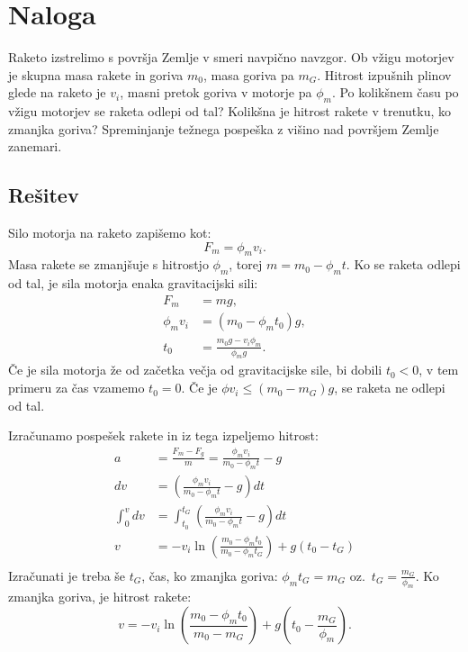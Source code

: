 \documentclass[a4,11pt]{article}
\begin{document}
\section{Naloga}
    Raketo izstrelimo s površja Zemlje v smeri navpično navzgor. Ob vžigu motorjev je skupna
    masa rakete in goriva \(m_0\), masa goriva pa \(m_G\). Hitrost izpušnih plinov glede na raketo je \(v_i\),
    masni pretok goriva v motorje pa \(\phi_m\). Po kolikšnem času po vžigu motorjev se raketa odlepi
    od tal? Kolikšna je hitrost rakete v trenutku, ko zmanjka goriva? Spreminjanje težnega
    pospeška z višino nad površjem Zemlje zanemari.

\subsection*{Rešitev}
    Silo motorja na raketo zapišemo kot:
    \[F_m = \phi_m v_i.\]
    Masa rakete se zmanjšuje s hitrostjo \(\phi_m\), torej \(m = m_0 - \phi_m t\).
    Ko se raketa odlepi od tal, je sila motorja enaka gravitacijski sili:
    \begin{align*}
        F_m &= m g, \\
        \phi_m v_i &= \left(m_0 - \phi_m t_0\right) g, \\
        t_0 &= \frac{m_0 g - v_i\phi_m}{\phi_m g}.
    \end{align*}
    Če je sila motorja že od začetka večja od gravitacijske sile, bi dobili \(t_0 < 0\), v tem primeru za čas vzamemo \(t_0 = 0\).
    Če je \(\phi v_i \le \left(m_0 - m_G\right) g\), se raketa ne odlepi od tal.

    Izračunamo pospešek rakete in iz tega izpeljemo hitrost:
    \begin{align*}
        a &= \frac{F_m - F_g}{m} = \frac{\phi_m v_i}{m_0 - \phi_m t} - g \\
        dv &= \left(\frac{\phi_m v_i}{m_0 - \phi_m t} - g\right) dt \\
        \int_0^v dv &= \int_{t_0}^{t_G} \left(\frac{\phi_m v_i}{m_0 - \phi_m t} - g\right) dt \\
        v &= -v_i \ln\left(\frac{m_0 - \phi_m t_0}{m_0 - \phi_m t_G}\right) + g\left(t_0 - t_G\right) \\
    \end{align*}
    Izračunati je treba še \(t_G\), čas, ko zmanjka goriva:
    \(\phi_m t_G = m_G\) oz.~\(t_G = \frac{m_G}{\phi_m}\).
    Ko zmanjka goriva, je hitrost rakete:
    \[v = -v_i \ln\left(\frac{m_0 - \phi_m t_0}{m_0 - m_G}\right) + g\left(t_0 - \frac{m_G}{\phi_m}\right).\]
\end{document}
